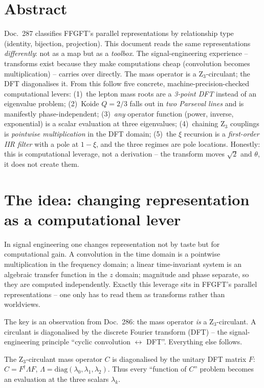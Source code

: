 \section*{Abstract}
Doc.~287 classifies FFGFT's parallel representations by relationship type (identity, bijection,
projection). This document reads the same representations \emph{differently}: not as a map but as a
\emph{toolbox}. The signal-engineering experience -- transforms exist because they make computations
cheap (convolution becomes multiplication) -- carries over directly. The mass operator is a
Z$_3$-circulant; the DFT diagonalises it. From this follow five concrete, machine-precision-checked
computational levers: (1)~the lepton mass roots are a \emph{3-point DFT} instead of an eigenvalue
problem; (2)~Koide $Q=2/3$ falls out in \emph{two Parseval lines} and is manifestly phase-independent;
(3)~\emph{any} operator function (power, inverse, exponential) is a scalar evaluation at three
eigenvalues; (4)~chaining Z$_3$ couplings is \emph{pointwise multiplication} in the DFT domain;
(5)~the $\xi$ recursion is a \emph{first-order IIR filter} with a pole at $1-\xi$, and the three
regimes are pole locations. Honestly: this is computational leverage, not a derivation -- the
transform moves $\sqrt2$ and $\theta$, it does not create them.

\section{The idea: changing representation as a computational lever}
In signal engineering one changes representation not by taste but for computational gain. A convolution
in the time domain is a pointwise multiplication in the frequency domain; a linear time-invariant
system is an algebraic transfer function in the $z$ domain; magnitude and phase separate, so they are
computed independently. Exactly this leverage sits in FFGFT's parallel representations -- one only has
to read them as transforms rather than worldviews.

The key is an observation from Doc.~286: the mass operator \emph{is} a Z$_3$-circulant. A circulant is
diagonalised by the discrete Fourier transform (DFT) -- the signal-engineering principle \enquote{cyclic
convolution $\leftrightarrow$ DFT}. Everything else follows.

\begin{keyresult}
The Z$_3$-circulant mass operator $C$ is diagonalised by the unitary DFT matrix $F$:
$C = F^{\dagger}\Lambda F$, $\Lambda=\mathrm{diag}(\lambda_0,\lambda_1,\lambda_2)$. Thus every
\enquote{function of $C$} problem becomes an evaluation at the three scalars $\lambda_k$.
\end{keyresult}


